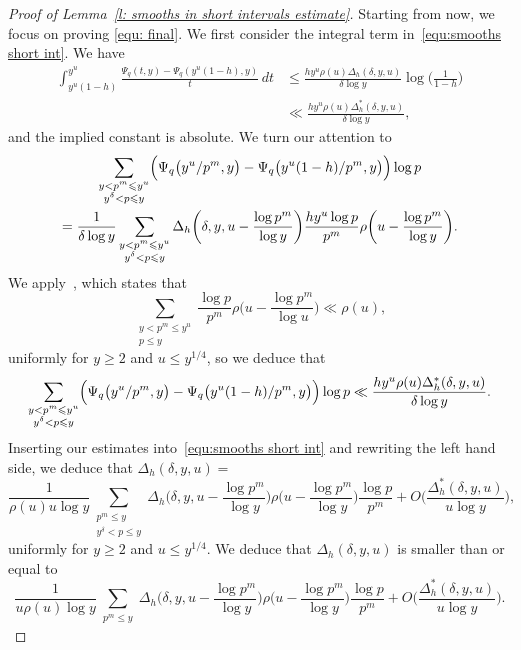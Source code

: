 \documentclass[12pt,a4paper,reqno]{amsart}
\numberwithin{equation}{section}
\def\leq {\leqslant}
\theoremstyle{remark}
\theoremstyle{definition}
\numberwithin{equation}{section}
\theoremstyle{remark}
\begin{document}
\begin{proof}[Proof of Lemma~\ref{l: smooths in short intervals estimate}]
Starting from now, we focus on proving \eqref{equ: final}.
We first consider the integral term in~\eqref{equ:smooths short int}. We have
\begin{align*}
\int_{y^u (1-h)}^{y^u} \frac{\Psi_q (t,y) - \Psi_q (y^u (1-h),y)}{t} \, dt & \leq \frac{h y^u \rho(u )\Delta_h (\delta, y, u)}{\delta \log y} \log \biggl( \frac{1}{1-h} \biggr) \\
& \ll \frac{h y^u \rho(u) \Delta_h^* (\delta, y, u)}{\delta \log y} ,
\end{align*}
and the implied constant is absolute. We turn our attention to
\begin{multline*}
\sum_{\substack{y < p^m \leq y^u \\ y^{\delta} < p \leq y}} \Bigl( \Psi_q \bigl( y^u/p^m , y \bigr) - \Psi_q \bigl( y^u (1-h)/p^m, y \bigr) \Bigr) \log p \\
= \frac{1}{\delta \log y} \sum_{\substack{y < p^m \leq y^u \\ y^{\delta} < p \leq y}} \Delta_h \biggl( \delta, y, u - \frac{\log p^m}{\log y} \biggr) \frac{h y^u \log p}{p^m} \rho \biggl( u - \frac{\log p^m}{\log y} \biggr) .
\end{multline*}
We apply~\cite[Lemma~3]{Hildebrand}, which states that
\[
\sum_{\substack{y < p^m \leq y^u \\ p \leq y}} \frac{\log p}{p^m} \rho \biggl( u - \frac{\log p^m}{\log u} \biggr) \ll \rho (u) ,
\]
uniformly for $y \geq 2$ and $u \leq y^{1/4}$, so we deduce that
\[
\sum_{\substack{y < p^m \leq y^u \\ y^{\delta} < p \leq y}} \Bigl( \Psi_q \bigl( y^u/p^m , y \bigr) - \Psi_q \bigl( y^u (1-h)/p^m, y \bigr) \Bigr) \log p  \ll \frac{h y^u \rho (u)  \Delta_h^* (\delta, y, u) }{\delta \log y} .
\]
Inserting our estimates into~\eqref{equ:smooths short int} and rewriting the left hand side, we deduce that $\Delta_h (\delta,y,u) =$
\[
\frac{1}{\rho(u) u \log y} \sum_{\substack{p^m \leq y \\ y^{\delta} < p \leq y}} \Delta_h \biggl( \delta, y, u - \frac{\log p^m}{\log y} \biggr) \rho \biggl( u - \frac{\log p^m}{\log y} \biggr) \frac{\log p}{p^m} + O \biggl( \frac{\Delta_h^* (\delta, y, u)}{u \log y} \biggr) ,
\]
uniformly for $y \geq 2$ and $u \leq y^{1/4}$. We deduce that $\Delta_h (\delta,y,u)$ is smaller than or equal to
\[
\frac{1}{u \rho(u) \log y} \sum_{\substack{p^m \leq y}} \Delta_h \biggl( \delta, y, u - \frac{\log p^m}{\log y} \biggr) \rho \biggl( u - \frac{\log p^m}{\log y} \biggr) \frac{\log p}{p^m} +  O \biggl( \frac{\Delta_h^* (\delta, y, u)}{u \log y} \biggr).
\]
\end{proof}
\end{document}
